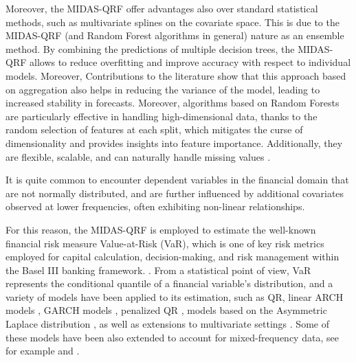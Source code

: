 \vspace{0.15in}

\noindent Moreover, the MIDAS-QRF offer advantages also over standard statistical methods, such as multivariate splines on the covariate space. This is due to the MIDAS-QRF (and Random Forest algorithms in general) nature as an ensemble method. By combining the predictions of multiple decision trees, the MIDAS-QRF allows to reduce overfitting and improve accuracy with respect to individual models. Moreover, Contributions to the literature \citep{genuer2012variance, breiman1996bagging, breiman2001random, hastie2009random} show that this approach based on aggregation also helps in reducing the variance of the model, leading to increased stability in forecasts. Moreover, algorithms based on Random Forests are particularly effective in handling high-dimensional data, thanks to the random selection of features at each split, which mitigates the curse of dimensionality and provides insights into feature importance. Additionally, they are flexible, scalable, and can naturally handle missing values \citep{breiman2001random}. 

\vspace{0.15in}

\noindent It is quite common to encounter dependent variables in the financial domain that are not normally distributed, and are further influenced by additional covariates observed at lower frequencies, often exhibiting non-linear relationships.
\vspace{0.15in}

\noindent For this reason, the MIDAS-QRF is employed to estimate the well-known financial risk measure Value-at-Risk (VaR), which is one of key risk metrics employed for capital calculation, decision-making, and risk management within the Basel III banking framework. \citep{Jorion:1997}. From a statistical point of view, VaR represents the conditional quantile of a financial variable's distribution, and a variety of models have been applied to its estimation, such as QR, linear ARCH models \citep{koenker1996conditional, taylor1999quantile}, GARCH models \citep{xiao2009conditional, lee2013quantile, zheng2018hybrid}, penalized QR \citep{bayer2018combining}, models based on the Asymmetric Laplace distribution \citep{merlo2021forecasting, taylor2019forecasting}, as well as extensions to multivariate settings \citep{petrella2019joint, bernardi2017multiple, merlo2022quantile}. Some of these models have been also extended to account for mixed-frequency data, see for example \cite{engle2013stock, candila2023mixed} and \cite{mo2018macroeconomic}.
\vspace{0.15in}

